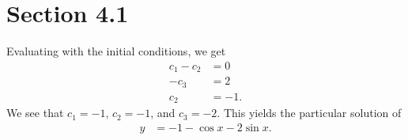 \documentclass[10pt]{mypackage}
\begin{document}
\RaggedRight
\section{Section 4.1}%
\begin{solution}[Problem 4]
  Evaluating with the initial conditions, we get
  \begin{align*}
    c_1- c_2 &= 0\\
    - c_3 &= 2\\
    c_2 &= -1.
  \end{align*}
  We see that $c_1 = -1$, $c_2 = -1$, and $c_3 = -2$. This yields the particular solution of
  \begin{align*}
    y &= -1 - \cos x - 2 \sin x.
  \end{align*}
\end{solution}
\end{document}
